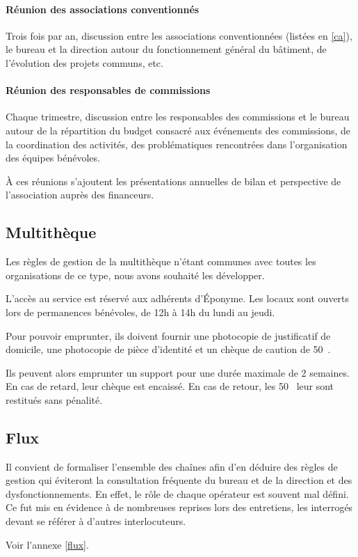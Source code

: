 \paragraph{Réunion des associations conventionnés} Trois fois par an,
discussion entre les associations conventionnées (listées en \ref{ca}),
le bureau et la direction autour du fonctionnement général du bâtiment,
de l'évolution des projets communs, etc.

\paragraph{Réunion des responsables de commissions} Chaque trimestre,
discussion entre les responsables des commissions et le bureau
autour de la répartition du budget consacré aux événements des commissions,
de la coordination des activités, des problématiques rencontrées dans
l'organisation des équipes bénévoles.

À ces réunions s'ajoutent les présentations annuelles de bilan et perspective
de l'association auprès des financeurs.

\subsection{Multithèque}
\label{multitheque}

Les règles de gestion de la multithèque n'étant communes avec toutes les
organisations de ce type, nous avons souhaité les développer.

L'accès au service est réservé aux adhérents d'Éponyme. Les locaux sont ouverts
lors de permanences bénévoles, de 12h à 14h du lundi au jeudi.

Pour pouvoir emprunter, ils doivent fournir une photocopie de justificatif de domicile,
une photocopie de pièce d'identité et un chèque de caution de 50~{\texteuro}.

Ils peuvent alors emprunter un support pour une durée maximale de 2 semaines.
En cas de retard, leur chèque est encaissé. En cas de retour, les 50~{\texteuro}
leur sont restitués sans pénalité.

\subsection{Flux}

Il convient de formaliser l'ensemble des chaînes afin d'en déduire des règles
de gestion qui éviteront la consultation fréquente du bureau et de la direction
et des dysfonctionnements. En effet, le rôle de chaque opérateur est souvent
mal défini. Ce fut mis en évidence à de nombreuses reprises lors des entretiens,
les interrogés devant se référer à d'autres interlocuteurs.

Voir l'annexe \ref{flux}.